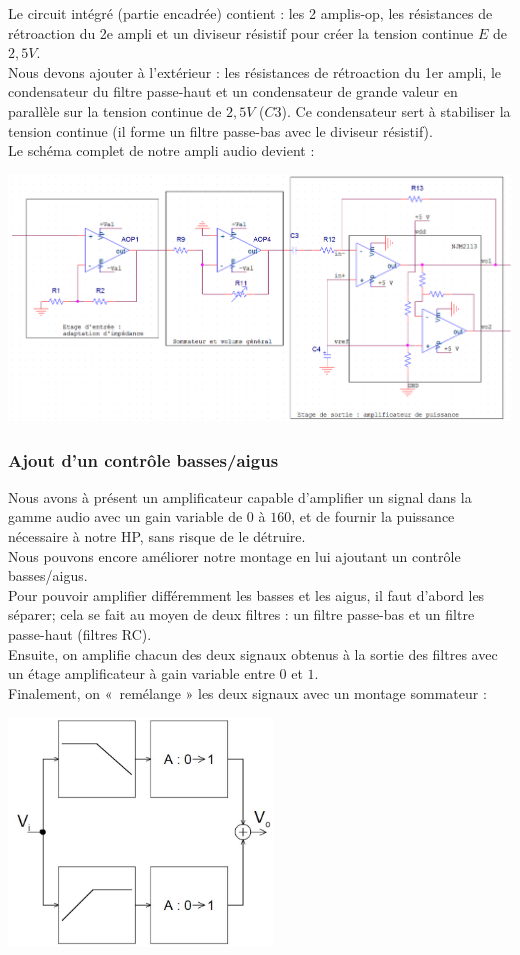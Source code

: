 \documentclass{../template/labo}
\begin{document}
Le circuit intégré (partie encadrée) contient : les 2 amplis-op, les résistances de rétroaction du 2e ampli et un diviseur résistif pour créer la tension continue $E$ de $2,5V$.\\
Nous devons ajouter à l'extérieur : les résistances de rétroaction du 1er ampli, le condensateur du filtre passe-haut et un condensateur de grande valeur en parallèle sur la tension continue de $2,5V$ ($C3$). Ce condensateur sert à stabiliser la tension continue (il forme un filtre passe-bas avec le diviseur résistif).\\
Le schéma complet de notre ampli audio devient :
\begin{center}
\includegraphics[width=16cm]{figures/montage_complet_sans_bassesaigus.png}
\end{center}

\subsubsection{Ajout d'un contrôle basses/aigus}
Nous avons à présent un amplificateur capable d'amplifier un signal dans la gamme audio avec un gain variable de $0$ à $160$, et de fournir la puissance nécessaire à notre HP, sans risque de le détruire.\\
Nous pouvons encore améliorer notre montage en lui ajoutant un contrôle basses/aigus.\\
Pour pouvoir amplifier différemment les basses et les aigus, il faut d'abord les séparer; cela se fait au moyen de deux filtres : un filtre passe-bas et un filtre passe-haut (filtres RC).\\
Ensuite, on amplifie chacun des deux signaux obtenus à la sortie des filtres avec un étage amplificateur à gain variable entre $0$ et $1$.\\
Finalement, on « remélange » les deux signaux avec un montage sommateur :
\begin{center}
\includegraphics[width=7cm]{figures/AOPsommateur}
\end{center}
\end{document}
